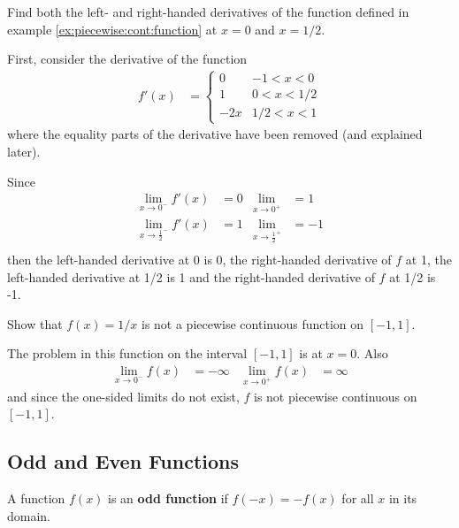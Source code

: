 \begin{example}
Find both the left- and right-handed derivatives of the function defined in example \ref{ex:piecewise:cont:function} at $x=0$ and $x=1/2$.  

\solution

First, consider the derivative of the function 
\begin{align*}
f'(x) & = \begin{cases}
0 & -1 < x < 0 \\
1 & 0 < x < 1/2 \\
-2x & 1/2 < x < 1
\end{cases}
\end{align*}
where the equality parts of the derivative have been removed (and explained later). 

Since
%
\begin{align*}
\lim_{x \rightarrow 0^{-}} f'(x) & = 0 & \lim_{x \rightarrow 0^+} & = 1 \\
\lim_{x \rightarrow \frac{1}{2}^{-}} f'(x) & = 1 & \lim_{x \rightarrow \frac{1}{2}^+} & = -1 \\
\end{align*}
then the left-handed derivative at 0 is 0, the right-handed derivative of $f$ at 1, the left-handed derivative at 1/2 is 1 and the right-handed derivative of $f$ at 1/2 is -1.  

\end{example}


\begin{example}
Show that $f(x)=1/x$ is not a piecewise continuous function on $[-1,1]$.  

\solution

The problem in this function on the interval $[-1,1]$ is at $x=0$.  Also
%
\begin{align*}
\lim_{x \rightarrow 0^-} f(x) & = -\infty & \lim_{x \rightarrow 0^+} f(x) & = \infty
\end{align*}
and since the one-sided limits do not exist, $f$ is not piecewise continuous on $[-1,1]$. 

\end{example}

\subsection{Odd and Even Functions} 

\begin{definition}
A function $f(x)$ is an \textbf{odd function} if $f(-x) = -f(x)$ for all $x$ in its domain.  
\end{definition}


